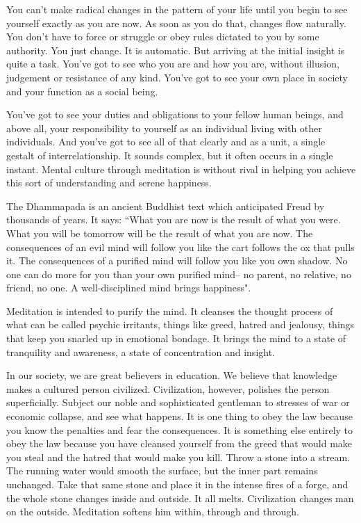 You can't make radical changes in the pattern of your life until you begin to
see yourself exactly as you are now. As soon as you do that, changes flow
naturally. You don't have to force or struggle or obey rules dictated to you by
some authority. You just change. It is automatic. But arriving at the initial
insight is quite a task. You've got to see who you are and how you are, without
illusion, judgement or resistance of any kind. You've got to see your own place
in society and your function as a social being.

You've got to see your duties and obligations to your fellow human beings, and
above all, your responsibility to yourself as an individual living with other
individuals. And you've got to see all of that clearly and as a unit, a single
gestalt of interrelationship.  It sounds complex, but it often occurs in a
single instant. Mental culture through meditation is without rival in helping
you achieve this sort of understanding and serene happiness.

The Dhammapada is an ancient Buddhist text which anticipated Freud by thousands
of years. It says: ``What you are now is the result of what you were. What you
will be tomorrow will be the result of what you are now. The consequences of an
evil mind will follow you like the cart follows the ox that pulls it. The
consequences of a purified mind will follow you like you own shadow. No one can
do more for you than your own purified mind-- no parent, no relative, no friend,
no one. A well-disciplined mind brings happiness".

Meditation is intended to purify the mind. It cleanses the thought process of
what can be called psychic irritants, things like greed, hatred and jealousy,
things that keep you snarled up in emotional bondage. It brings the mind to a
state of tranquility and awareness, a state of concentration and insight.

In our society, we are great believers in education. We believe that knowledge
makes a cultured person civilized. Civilization, however, polishes the person
superficially. Subject our noble and sophisticated gentleman to stresses of war
or economic collapse, and see what happens. It is one thing to obey the law
because you know the penalties and fear the consequences. It is something else
entirely to obey the law because you have cleansed yourself from the greed that
would make you steal and the hatred that would make you kill. Throw a stone into
a stream. The running water would smooth the surface, but the inner part remains
unchanged. Take that same stone and place it in the intense fires of a forge,
and the whole stone changes inside and outside. It all melts. Civilization
changes man on the outside. Meditation softens him within, through and through.

